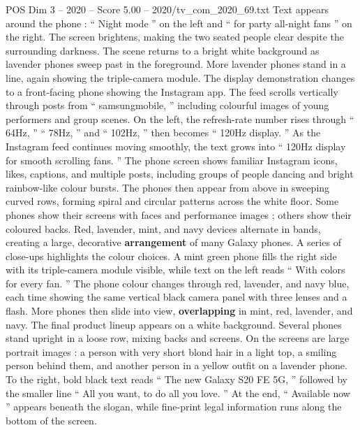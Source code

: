 \begin{textsample}{POS Dim 3 – 2020 – Score 5.00 – 2020/tv\_com\_2020\_69.txt}
Text appears around the phone : “ Night mode ” on the left and “ for party all-night fans ” on the right.
The screen brightens, making the two seated people clear despite the surrounding darkness.
The scene returns to a bright white background as lavender phones sweep past in the foreground.
More lavender phones stand in a line, again showing the triple-camera module.
The display demonstration changes to a front-facing phone showing the Instagram app.
The feed scrolls vertically through posts from “ samsungmobile, ” including colourful images of young performers and group scenes.
On the left, the refresh-rate number rises through “ 64Hz, ” “ 78Hz, ” and “ 102Hz, ” then becomes “ 120Hz display. ” As the Instagram feed continues moving smoothly, the text grows into “ 120Hz display for smooth scrolling fans. ” The phone screen shows familiar Instagram icons, likes, captions, and multiple posts, including groups of people dancing and bright rainbow-like colour bursts.
The phones then appear from above in sweeping curved rows, forming spiral and circular patterns across the white floor.
Some phones show their screens with faces and performance images ; others show their coloured backs.
Red, lavender, mint, and navy devices alternate in bands, creating a large, decorative \textbf{arrangement} of many Galaxy phones.
A series of close-ups highlights the colour choices.
A mint green phone fills the right side with its triple-camera module visible, while text on the left reads “ With colors for every fan. ” The phone colour changes through red, lavender, and navy blue, each time showing the same vertical black camera panel with three lenses and a flash.
More phones then slide into view, \textbf{overlapping} in mint, red, lavender, and navy.
The final product lineup appears on a white background.
Several phones stand upright in a loose row, mixing backs and screens.
On the screens are large portrait images : a person with very short blond hair in a light top, a smiling person behind them, and another person in a yellow outfit on a lavender phone.
To the right, bold black text reads “ The new Galaxy S20 FE 5G, ” followed by the smaller line “ All you want, to do all you love. ” At the end, “ Available now ” appears beneath the slogan, while fine-print legal information runs along the bottom of the screen.

\end{textsample}
